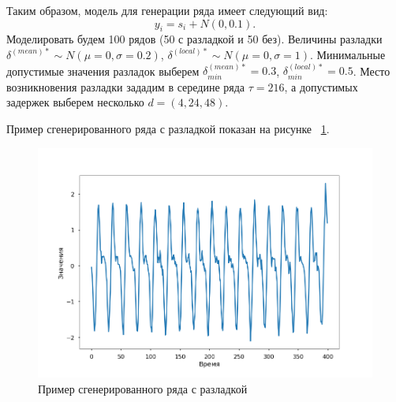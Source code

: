 \documentclass[%
12pt,
master,  %
natbib,      %
subf,        %
substylefile = spbu.rtx,
href,        %
colorlinks,  %
]{disser}
\begin{document}
Таким образом, модель для генерации ряда имеет следующий вид:
\begin{equation*} y_i = s_i + N(0,0.1).\end{equation*}
Моделировать будем 100 рядов (50 с разладкой и 50 без). Величины разладки $\delta^{(mean)*} \sim N(\mu = 0,\sigma = 0.2)$, $\delta^{(local)*} \sim N(\mu = 0,\sigma = 1)$. Минимальные допустимые значения разладок выберем $\delta^{(mean)*}_{min} = 0.3$, $\delta^{(local)*}_{min} = 0.5$. Место возникновения разладки зададим в середине ряда $\tau = 216$, а допустимых задержек выберем несколько $d = (4, 24, 48)$.

Пример сгенерированного ряда с разладкой показан на рисунке ~\ref{fig:data_modeling_example_2}.

\begin{figure}[!hhh]
	\begin{center}
		\includegraphics[width=12cm]{data_modeling_example_2}
	\end{center}
	\vspace{-5mm}\caption{Пример сгенерированного ряда с разладкой}
	\label{fig:data_modeling_example_2}
\end{figure}

%
%
\end{document}

